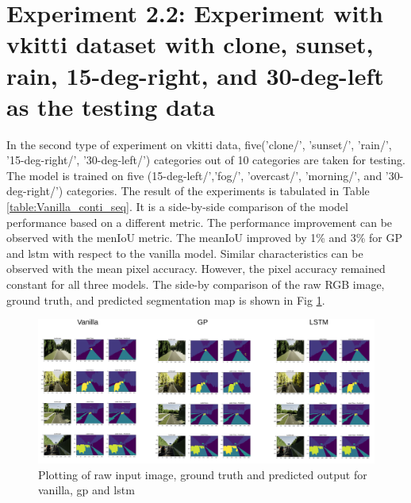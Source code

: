 	\section{Experiment 2.2: Experiment with vkitti dataset with clone, sunset, rain, 15-deg-right, and 30-deg-left as the testing data}
		
	In the second type of experiment on vkitti data, five('clone/', 'sunset/', 'rain/', '15-deg-right/',
	'30-deg-left/') categories out of 10 categories are taken for testing. The model is trained on five (15-deg-left/','fog/', 'overcast/', 'morning/', and '30-deg-right/') categories. The result of the experiments is tabulated in Table \ref{table:Vanilla_conti_seq}. It is a side-by-side comparison of the model performance based on a different metric. The performance improvement can be observed with the menIoU metric. The meanIoU improved by 1\% and 3\% for GP and lstm with respect to the vanilla model. Similar characteristics can be observed with the mean pixel accuracy. However, the pixel accuracy remained constant for all three models. The side-by comparison of the raw RGB image, ground truth, and predicted segmentation map is shown in Fig \ref{fig:unet_side_by_side_five_classes}. 
	
	\begin{figure}
		\centering
		\includegraphics[width=17cm]{images/unet_vkitti_five.png}
		\caption{Plotting of raw input image, ground truth and predicted output for vanilla, gp and lstm}
		\label{fig:unet_side_by_side_five_classes}
	\end{figure}

